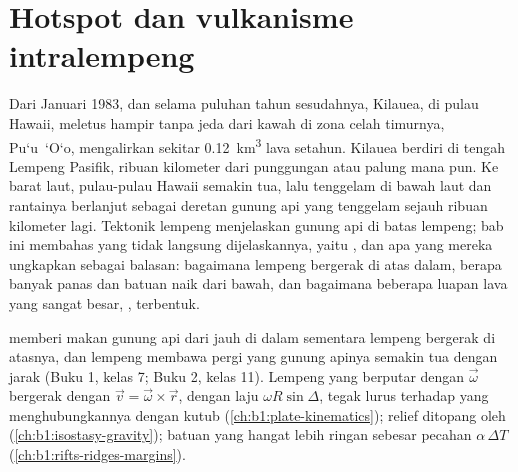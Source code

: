 \chapter{Hotspot dan vulkanisme intralempeng}\label{ch:b1:hotspots}

Dari Januari 1983, dan selama puluhan tahun sesudahnya, Kilauea, di pulau Hawaii, meletus hampir tanpa jeda dari kawah di zona celah timurnya, Pu\textquoteleft u~\textquoteleft O\textquoteleft o, mengalirkan sekitar \qty{0.12}{km^3} lava setahun. Kilauea berdiri di tengah Lempeng Pasifik, ribuan kilometer dari punggungan atau palung mana pun. Ke barat laut, pulau-pulau Hawaii semakin tua, lalu tenggelam di bawah laut dan rantainya berlanjut sebagai deretan gunung api yang tenggelam sejauh ribuan kilometer lagi. Tektonik lempeng menjelaskan gunung api di batas lempeng; bab ini membahas yang tidak langsung dijelaskannya, yaitu , dan apa yang mereka ungkapkan sebagai balasan: bagaimana lempeng bergerak di atas  dalam, berapa banyak panas dan batuan naik dari bawah, dan bagaimana beberapa luapan lava yang sangat besar, , terbentuk.

\begin{recall}
 memberi makan gunung api dari jauh di dalam  sementara lempeng bergerak di atasnya, dan lempeng membawa pergi  yang gunung apinya semakin tua dengan jarak (Buku 1, kelas 7; Buku 2, kelas 11). Lempeng yang berputar dengan  $\vec\omega$ bergerak dengan $\vec v = \vec\omega\times\vec r$, dengan laju $\omega R\sin\Delta$, tegak lurus terhadap  yang menghubungkannya dengan kutub (\cref{ch:b1:plate-kinematics}); relief ditopang oleh  (\cref{ch:b1:isostasy-gravity}); batuan yang hangat lebih ringan sebesar pecahan $\alpha\,\Delta T$ (\cref{ch:b1:rifts-ridges-margins}).
\end{recall}

